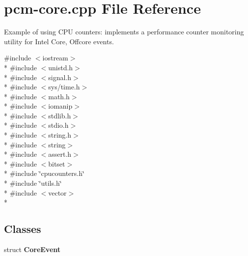 \section{pcm-\/core.cpp File Reference}
\label{pcm-core_8cpp}


Example of using C\+PU counters\+: implements a performance counter monitoring utility for Intel Core, Offcore events.  


{\ttfamily \#include $<$iostream$>$}\\*
{\ttfamily \#include $<$unistd.\+h$>$}\\*
{\ttfamily \#include $<$signal.\+h$>$}\\*
{\ttfamily \#include $<$sys/time.\+h$>$}\\*
{\ttfamily \#include $<$math.\+h$>$}\\*
{\ttfamily \#include $<$iomanip$>$}\\*
{\ttfamily \#include $<$stdlib.\+h$>$}\\*
{\ttfamily \#include $<$stdio.\+h$>$}\\*
{\ttfamily \#include $<$string.\+h$>$}\\*
{\ttfamily \#include $<$string$>$}\\*
{\ttfamily \#include $<$assert.\+h$>$}\\*
{\ttfamily \#include $<$bitset$>$}\\*
{\ttfamily \#include \char`\"{}cpucounters.\+h\char`\"{}}\\*
{\ttfamily \#include \char`\"{}utils.\+h\char`\"{}}\\*
{\ttfamily \#include $<$vector$>$}\\*
\subsection*{Classes}
\begin{DoxyCompactItemize}
\item 
struct {\bf Core\+Event}
\end{DoxyCompactItemize}
